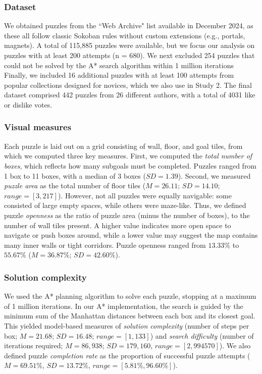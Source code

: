 \documentclass[10pt,letterpaper]{article}
\newcommand{\kz}[1]{{\color{blue}KZ: #1}}
\begin{document}
\subsubsection{Dataset}

We obtained puzzles from the ``Web Archive" list available in December 2024, as these all follow classic Sokoban rules without custom extensions (e.g., portals, magnets). 
A total of 115,885 puzzles were available, but we focus our analysis on puzzles with at least 200 attempts (n = 680). %
We next excluded 254 puzzles that could not be solved by the A* search algorithm within 1 million iterations
Finally, we included 16 additional puzzles with at least 100 attempts from popular collections designed for novices, which we also use in Study 2.
The final dataset comprised 442 puzzles from 26 different authors, with a total of 4031 like or dislike votes. %

\subsubsection{Visual measures}

Each puzzle is laid out on a grid consisting of wall, floor, and goal tiles, from which we computed three key measures. First, we computed the \textit{total number of boxes}, which reflects how many subgoals must be completed. Puzzles ranged from 1 box to 11 boxes, with a median of 3 boxes ($SD = 1.39$). Second, we measured \textit{puzzle area} as the total number of floor tiles ($M = 26.11$; $SD = 14.10$; $range = [3, 217]$). However, not all puzzles were equally navigable: some consisted of large empty spaces, while others were maze-like. Thus, we defined puzzle \textit{openness} as the ratio of puzzle area (minus the number of boxes), to the number of wall tiles present. A higher value indicates more open space to navigate or push boxes around, while a lower value may suggest the map contains many inner walls or tight corridors. Puzzle openness ranged from $13.33\%$ to $55.67\%$ ($M = 36.87\%$; $SD = 42.60\%$).

\subsubsection{Solution complexity} 

We used the A* planning algorithm \cite{hart1968formal, todd2023level} to solve each puzzle, stopping at a maximum of 1 million iterations. 
In our A* implementation, the search is guided by the minimum sum of the Manhattan distances between each box and its closest goal.
This yielded model-based measures of \textit{solution complexity} (number of steps per box; $M = 21.68$; $SD=16.48$; $range = [1, 133]$) and \textit{search difficulty} (number of iterations required; $M = 86,938$; $SD = 179,160$, $range = [2, 994570]$). %
We also defined puzzle \textit{completion rate} as the proportion of successful puzzle attempts ($M =69.51\%$, $SD = 13.72\%$, $range = [5.81\%, 96.60\%]$). 
\end{document}
